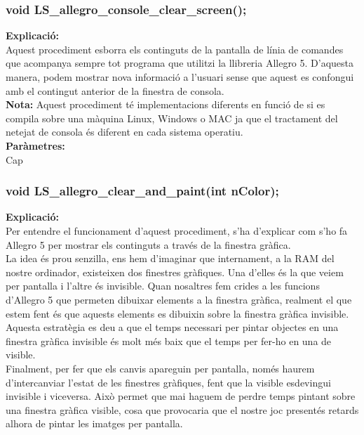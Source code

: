 \documentclass[11pt]{article}
\begin{document}
\subsubsection{void LS\_allegro\_console\_clear\_screen();}
\textbf{Explicació:}\\
Aquest procediment esborra els continguts de la pantalla de línia de comandes que acompanya sempre tot programa que utilitzi la llibreria Allegro 5. D'aquesta manera, podem mostrar nova informació a l'usuari sense que aquest es confongui amb el contingut anterior de la finestra de consola.\\

\noindent \textbf{Nota:} Aquest procediment té implementacions diferents en funció de si es compila sobre una màquina Linux, Windows o MAC ja que el tractament del netejat de consola és diferent en cada sistema operatiu.\\

\noindent \textbf{Paràmetres:}\\ Cap

\subsubsection{void LS\_allegro\_clear\_and\_paint(int nColor);}
\textbf{Explicació:}\\
Per entendre el funcionament d'aquest procediment, s'ha d'explicar com s'ho fa Allegro 5 per mostrar els continguts a través de la finestra gràfica.\\

\noindent La idea és prou senzilla, ens hem d'imaginar que internament, a la RAM del nostre ordinador, existeixen dos finestres gràfiques. Una d'elles és la que veiem per pantalla i l'altre és invisible. Quan nosaltres fem crides a les funcions d'Allegro 5 que permeten dibuixar elements a la finestra gràfica, realment el que estem fent és que aquests elements es dibuixin sobre la finestra gràfica invisible. Aquesta estratègia es deu a que el temps necessari per pintar objectes en una finestra gràfica invisible és molt més baix que el temps per fer-ho en una de visible. \\

\noindent Finalment, per fer que els canvis apareguin per pantalla, només haurem d'intercanviar l'estat de les finestres gràfiques, fent que la visible esdevingui invisible i viceversa. Això permet que mai haguem de perdre temps pintant sobre una finestra gràfica visible, cosa que provocaria que el nostre joc presentés retards alhora de pintar les imatges per pantalla.\\
\end{document}
